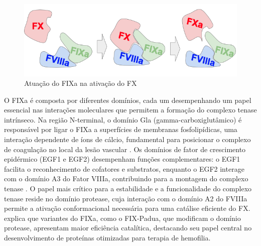 \begin{figure}[H]
    \centering
    \includegraphics[width=.8\textwidth]{figuras/ativaFX.png}
    \caption{Atuação do FIXa na ativação do FX}
  \end{figure}

O FIXa é composta por diferentes domínios,
cada um desempenhando um papel essencial nas interações moleculares que permitem a formação do complexo tenase intrínseco. 
Na região N-terminal, o domínio Gla (gamma-carboxiglutâmico) é responsável por ligar o FIXa a superfícies de membranas fosfolipídicas, 
uma interação dependente de íons de cálcio, 
fundamental para posicionar o complexo de coagulação no local da lesão vascular \cite{FIX}. 
Os domínios de fator de crescimento epidérmico (EGF1 e EGF2) desempenham funções complementares: 
o EGF1 facilita o reconhecimento de cofatores e substratos, enquanto o EGF2 interage com o domínio A3 do Fator VIIIa,
contribuindo para a montagem do complexo tenase \cite{FIX}. 
O papel mais crítico para a estabilidade e a funcionalidade do complexo tenase reside no domínio protease,
cuja interação com o domínio A2 do FVIIIa permite a ativação conformacional necessária para uma catálise eficiente do FX.
\cite{FIX} explica que variantes do FIXa, como o FIX-Padua, que modificam o domínio protease, 
apresentam maior eficiência catalítica, destacando seu papel central no desenvolvimento de proteínas otimizadas para terapia de hemofilia.


